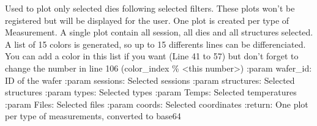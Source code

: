 \documentclass[letterpaper,10pt,english]{sphinxmanual}
\begin{document}

\begin{fulllineitems}
\label{\detokenize{plot_and_powerpoint:plot_and_powerpoint.plot_wanted_matrices}}
\pysigstartsignatures
{}
\pysigstopsignatures
\sphinxAtStartPar
Used to plot only selected dies following selected filters. These plots won’t be registered but will be displayed for the user.
One plot is created per type of Measurement.
A single plot contain all session, all dies and all structures selected. A list of 15 colors is generated, so up to 15 differents lines can be differenciated.
You can add a color in this list if you want (Line 41 to 57) but don’t forget to change the number in line 106 (color\_index \% \textless{}this number\textgreater{})
:param wafer\_id: ID of the wafer
:param sessions: Selected sessions
:param structures: Selected structures
:param types: Selected types
:param Temps: Selected temperatures
:param Files: Selected files
:param coords: Selected coordinates
:return: One plot per type of measurements, converted to base64

\end{fulllineitems}

\end{document}
